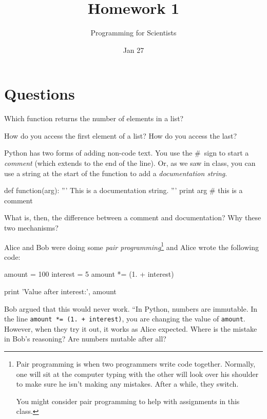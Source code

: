 
\author{Programming for Scientists}
\title{Homework 1}
\date{Jan 27}

\maketitle

\chapter{Questions}

\question
Which function returns the number of elements in a list?

\question
How do you access the first element of a list? How do you access the last?

\question
Python has two forms of adding non-code text. You use the \#~sign to start a \textit{comment} (which extends to the end of the line). Or, as we saw in class, you can use a string at the start of the function to add a \textit{documentation string}.

\begin{python}
def function(arg):
    '''
    This is a documentation string.
    '''
    print arg # this is a comment
\end{python}

What is, then, the difference between a comment and documentation? Why these two mechanisms?

\question
Alice and Bob were doing some \textit{pair programming}\footnote{Pair programming is when two programmers write code together. Normally, one will sit at the computer typing with the other will look over his shoulder to make sure he isn't making any mistakes. After a while, they switch.

You might consider pair programming to help with assignments in this class.} and Alice wrote the following code:

\begin{python}
amount = 100
interest = 5
amount *= (1. + interest)

print 'Value after interest:', amount 
\end{python}

Bob argued that this would never work. ``In Python, numbers are immutable. In the line \lstinline{amount *= (1. + interest)}, you are changing the value of \lstinline{amount}. However, when they try it out, it works as Alice expected. Where is the mistake in Bob's reasoning? Are numbers mutable after all?

